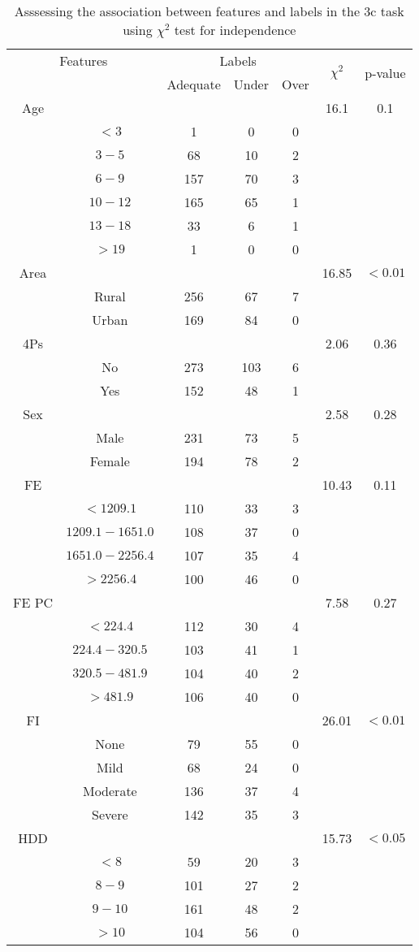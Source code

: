 \begin{table}[!htb]
\centering
\caption{Asssessing the association between features and labels in the 3c task using $\chi^2$ test for independence}
\label{tab:chitest_3c}
\begin{tabular}{c c | c c c| c | c}
\hline
\multicolumn{2}{c|}{Features}& \multicolumn{3}{c|}{Labels}& \multirow{2}{*}{$\chi^2$} & \multirow{2}{*}{p-value}\\ 
& & Adequate & Under & Over & & \\ 
\hline
Age &  &  &  & & 16.1 & 0.1 \\ 
& $< 3$ & 1 & 0 & 0& & \\ 
& $3-5$ & 68 & 10 & 2& & \\ 
& $6-9$ & 157 & 70 & 3& & \\ 
& $10-12$ & 165 & 65 & 1& & \\ 
& $13-18$ & 33 & 6 & 1& & \\ 
& $> 19$ & 1 & 0 & 0& & \\ 
\hline 
Area &  &  &  & & 16.85 & $< 0.01$ \\ 
& Rural & 256 & 67 & 7& & \\ 
& Urban & 169 & 84 & 0& & \\ 
\hline 
4Ps &  &  &  & & 2.06 & 0.36 \\ 
& No & 273 & 103 & 6& & \\ 
& Yes & 152 & 48 & 1& & \\ 
\hline 
Sex &  &  &  & & 2.58 & 0.28 \\ 
& Male & 231 & 73 & 5& & \\ 
& Female & 194 & 78 & 2& & \\ 
\hline 
FE &  &  &  & & 10.43 & 0.11 \\ 
& $< 1209.1$ & 110 & 33 & 3& & \\ 
& $1209.1-1651.0$ & 108 & 37 & 0& & \\ 
& $1651.0-2256.4$ & 107 & 35 & 4& & \\ 
& $> 2256.4$ & 100 & 46 & 0& & \\ 
\hline 
FE PC &  &  &  & & 7.58 & 0.27 \\ 
& $< 224.4$ & 112 & 30 & 4& & \\ 
& $224.4-320.5$ & 103 & 41 & 1& & \\ 
& $320.5-481.9$ & 104 & 40 & 2& & \\ 
& $> 481.9$ & 106 & 40 & 0& & \\ 
\hline 
FI &  &  &  & & 26.01 & $< 0.01$ \\ 
& None & 79 & 55 & 0& & \\ 
& Mild & 68 & 24 & 0& & \\ 
& Moderate & 136 & 37 & 4& & \\ 
& Severe & 142 & 35 & 3& & \\ 
\hline 
HDD &  &  &  & & 15.73 & $< 0.05$ \\ 
& $< 8$ & 59 & 20 & 3& & \\ 
& $8-9$ & 101 & 27 & 2& & \\ 
& $9-10$ & 161 & 48 & 2& & \\ 
& $> 10$ & 104 & 56 & 0& & \\ 
\hline 
\end{tabular}
\end{table}
